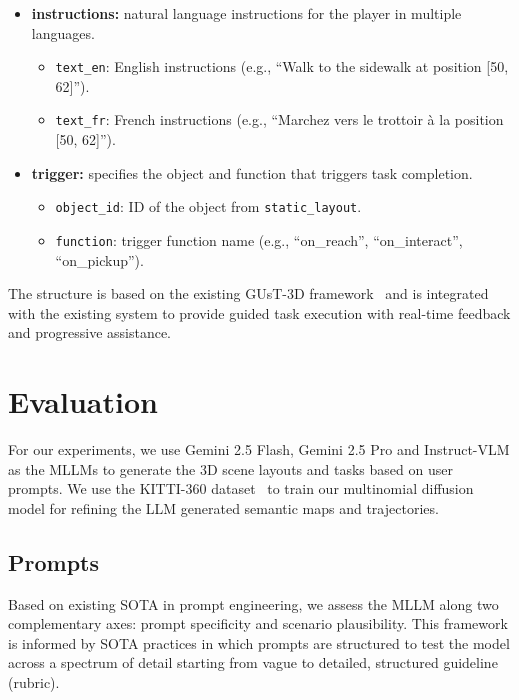 \documentclass{article}
\begin{document}
\begin{itemize}
    \item \textbf{instructions:} natural language instructions for the player in multiple languages.
    \begin{itemize}
        \item \texttt{text\_en}: English instructions (e.g., ``Walk to the sidewalk at position [50, 62]'').
        \item \texttt{text\_fr}: French instructions (e.g., ``Marchez vers le trottoir à la position [50, 62]'').
    \end{itemize}
    
    \item \textbf{trigger:} specifies the object and function that triggers task completion.
    \begin{itemize}
        \item \texttt{object\_id}: ID of the object from \texttt{static\_layout}.
        \item \texttt{function}: trigger function name (e.g., ``on\_reach'', ``on\_interact'', ``on\_pickup'').
    \end{itemize}
\end{itemize}

The structure is based on the existing GUsT-3D framework~\cite{wu2022designing} and is integrated with the existing system to provide guided task execution with real-time feedback and progressive assistance.

\section{Evaluation}

For our experiments, we use Gemini 2.5 Flash, Gemini 2.5 Pro and Instruct-VLM as the MLLMs to generate the 3D scene layouts and tasks based on user prompts. We use the KITTI-360 dataset~\cite{liao2022kitti360} to train our multinomial diffusion model for refining the LLM generated semantic maps and trajectories.

\subsection{Prompts}

Based on existing SOTA in prompt engineering, we assess the MLLM along two complementary axes: prompt specificity and scenario plausibility. This framework is informed by SOTA practices in which prompts are structured to test the model across a spectrum of detail starting from vague to detailed, structured guideline (rubric).
\end{document}

